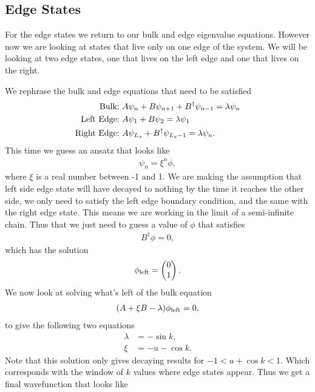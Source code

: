 \subsection{Edge States}
 For the edge states we return to our bulk and edge eigenvalue equations. However now we are looking at states that live only on one edge of the system. We will be looking at two edge states, one that lives on the left edge and one that lives on the right.\par
We rephrase the bulk and edge equations that need to be satisfied
\begin{align}
    \textup{Bulk:} &\ A\psi_n + B\psi_{n+1} + B^\dag \psi_{n-1} = \lambda \psi_n \\
    \textup{Left Edge:} &\ A\psi_1 + B\psi_{2} = \lambda \psi_1\\
    \textup{Right Edge:} &\ A\psi_{L_x} + B^\dag \psi_{L_x-1}  = \lambda \psi_n.
\end{align}
This time we guess an ansatz that looks like
\begin{align}
    \psi_n = \xi^n \phi,
\end{align}
where $\xi$ is a real number between -1 and 1. We are making the assumption that left side edge state will have decayed to nothing by the time it reaches the other side, we only need to satisfy the left edge boundary condition, and the same with the right edge state. This means we are working in the limit of a semi-infinite chain. Thus that we just need to guess a value of $\phi$ that satisfies 
\begin{align}
    B^\dag \phi = 0,
\end{align}
which has the solution
\begin{align}
    \phi_{\textup{left}} = \begin{pmatrix}
    0\\
    1
    \end{pmatrix}.
\end{align}
We now look at solving what's left of the bulk equation
\begin{align}
    (A + \xi B - \lambda)\phi_{\textup{left}} = 0,
\end{align}
to give the following two equations
\begin{align}
    \lambda &= -\sin k,\\
    \xi &= -u - \cos k.
\end{align}
Note that this solution only gives decaying results for $-1 < u+\cos k < 1$. Which corresponds with the window of $k$ values where edge states appear.
Thus we get a final wavefunction that looks like
